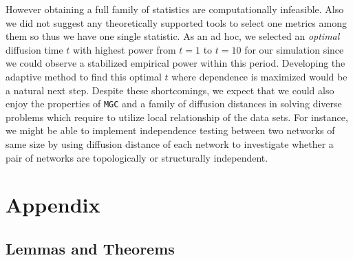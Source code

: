 \documentclass[11pt]{article}
\theoremstyle{definition}
\begin{document}
However obtaining a full family of statistics are computationally infeasible. Also we did not suggest any theoretically supported tools to select one metrics among them so thus we have one single statistic. As an ad hoc, we selected an \textit{optimal} diffusion time $t$ with highest power from $t=1$ to $t=10$ for our simulation since we could observe a stabilized empirical power within this period. Developing the adaptive method to find this optimal $t$ where dependence is maximized would be a natural next step. Despite these shortcomings, we expect that we could also enjoy the properties of \texttt{MGC} and a family of diffusion distances in solving diverse problems which require to utilize local relationship of the data sets. For instance, we might be able to implement independence testing between two networks of same size by using diffusion distance of each network to investigate whether a pair of networks are topologically or structurally independent.

\vspace*{-0.5cm}

%
\vspace*{-0.5cm}
\section{Appendix}
\vspace*{-0.2cm}
\subsection{Lemmas and Theorems}
\label{ssec:proof}
\end{document}
